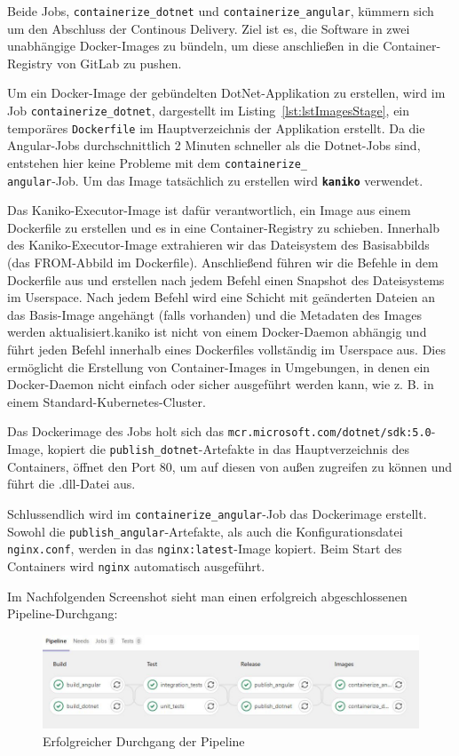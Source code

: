 Beide Jobs, \texttt{containerize\_dotnet} und \texttt{containerize\_angular}, kümmern sich um den Abschluss der Continous Delivery. Ziel ist es, die Software in zwei unabhängige Docker-Images zu bündeln, um diese anschließen in die Container-Registry von GitLab zu pushen.

Um ein Docker-Image der gebündelten DotNet-Applikation zu  erstellen, wird im Job \texttt{containerize\_dotnet}, dargestellt im Listing~\ref{lst:lstImagesStage}, ein temporäres \texttt{Dockerfile} im Hauptverzeichnis der Applikation erstellt. Da die Angular-Jobs durchschnittlich 2 Minuten schneller als die Dotnet-Jobs sind, entstehen hier keine Probleme mit dem \texttt{containerize\_\\angular}-Job. Um das Image tatsächlich zu erstellen wird \textbf{\texttt{kaniko}} verwendet.

Das Kaniko-Executor-Image ist dafür verantwortlich, ein Image aus einem Dockerfile zu erstellen und es in eine Container-Registry zu schieben. Innerhalb des Kaniko-Executor-Image extrahieren wir das Dateisystem des Basisabbilds (das FROM-Abbild im Dockerfile). Anschließend führen wir die Befehle in dem Dockerfile aus und erstellen nach jedem Befehl einen Snapshot des Dateisystems im Userspace. Nach jedem Befehl wird eine Schicht mit geänderten Dateien an das Basis-Image angehängt (falls vorhanden) und die Metadaten des Images werden aktualisiert\cite{kaniko}.kaniko ist nicht von einem Docker-Daemon abhängig und führt jeden Befehl innerhalb eines Dockerfiles vollständig im Userspace aus. Dies ermöglicht die Erstellung von Container-Images in Umgebungen, in denen ein Docker-Daemon nicht einfach oder sicher ausgeführt werden kann, wie z. B. in einem Standard-Kubernetes-Cluster.\cite{kaniko}

Das Dockerimage des Jobs holt sich das \texttt{mcr.microsoft.com/dotnet/sdk:5.0}-Image, kopiert die \texttt{publish\_dotnet}-Artefakte in das Hauptverzeichnis des Containers, öffnet den Port 80, um auf diesen von außen zugreifen zu können und führt die .dll-Datei aus.

Schlussendlich wird im \texttt{containerize\_angular}-Job das Dockerimage erstellt. Sowohl die \texttt{publish\_angular}-Artefakte, als auch die Konfigurationsdatei \texttt{nginx.conf}, werden in das \texttt{nginx:latest}-Image kopiert. Beim Start des Containers wird \texttt{nginx} automatisch ausgeführt.

Im Nachfolgenden Screenshot sieht man einen erfolgreich abgeschlossenen Pipeline-Durchgang:

\begin{figure}[h]
	\centerline{
		\includegraphics[width=1\textwidth, frame]{./grafiken/build_test_release_successful.JPG}
	}
	\vskip0pt
	\caption{Erfolgreicher Durchgang der Pipeline}
\end{figure}